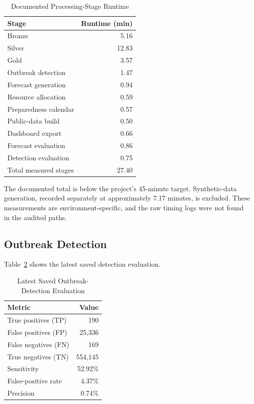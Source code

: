 ﻿\documentclass[conference]{IEEEtran}
\begin{document}
\begin{table}[!t]
\caption{Documented Processing-Stage Runtime}
\label{tab:runtime}
\centering
\begin{tabular}{lr}
\toprule
Stage & Runtime (min) \\
\midrule
Bronze & 5.16 \\
Silver & 12.83 \\
Gold & 3.57 \\
Outbreak detection & 1.47 \\
Forecast generation & 0.94 \\
Resource allocation & 0.59 \\
Preparedness calendar & 0.57 \\
Public-data build & 0.50 \\
Dashboard export & 0.66 \\
Forecast evaluation & 0.86 \\
Detection evaluation & 0.75 \\
\midrule
Total measured stages & 27.40 \\
\bottomrule
\end{tabular}
\end{table}

The documented total is below the project's 45-minute target. Synthetic-data generation, recorded separately at approximately 7.17 minutes, is excluded. These measurements are environment-specific, and the raw timing logs were not found in the audited paths.

\subsection{Outbreak Detection}

Table~\ref{tab:detection} shows the latest saved detection evaluation.

\begin{table}[!t]
\caption{Latest Saved Outbreak-Detection Evaluation}
\label{tab:detection}
\centering
\begin{tabular}{lr}
\toprule
Metric & Value \\
\midrule
True positives (TP) & 190 \\
False positives (FP) & 25,336 \\
False negatives (FN) & 169 \\
True negatives (TN) & 554,145 \\
Sensitivity & 52.92\% \\
False-positive rate & 4.37\% \\
Precision & 0.74\% \\
\bottomrule
\end{tabular}
\end{table}
\end{document}
